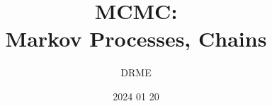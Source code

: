 \documentclass{beamer}
\begin{document}
\title{MCMC:\\Markov Processes, Chains}
\author{DRME}
\date{2024 01 20}


\frame{\titlepage}









\end{document}
